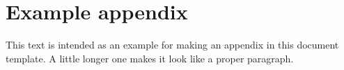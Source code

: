 \chapter{Example appendix}
\label{app:example}

This text is intended as an example for making an appendix in this document template. A little longer one makes it look like a proper paragraph.
